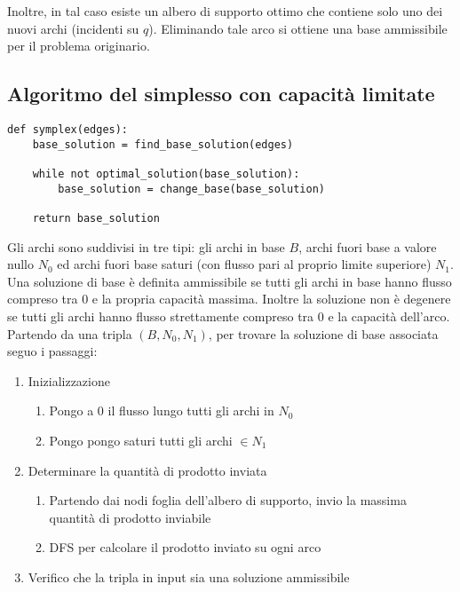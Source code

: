 \documentclass[../template]{subfiles}
\begin{document}
Inoltre, in tal caso esiste un albero di supporto ottimo che contiene solo uno dei nuovi archi (incidenti su $q$).
Eliminando tale arco si ottiene una base ammissibile per il problema originario.


\subsection{Algoritmo del simplesso con capacità limitate}
\begin{lstlisting}
def symplex(edges):
    base_solution = find_base_solution(edges)

    while not optimal_solution(base_solution):
        base_solution = change_base(base_solution)

    return base_solution
\end{lstlisting}
Gli archi sono suddivisi in tre tipi: gli archi in base $B$, archi fuori base a valore nullo $N_0$ ed archi fuori base saturi
(con flusso pari al proprio limite superiore) $N_1$.
\\
Una soluzione di base è definita ammissibile se tutti gli archi in base hanno flusso compreso tra 0 e la propria capacità massima.
Inoltre la soluzione non è degenere se tutti gli archi hanno flusso strettamente compreso tra 0 e la capacità dell'arco.
\\
Partendo da una tripla $(B, N_0, N_1)$, per trovare la soluzione di base associata seguo i passaggi:
\begin{enumerate}
    \item Inizializzazione
        \begin{enumerate}
            \item Pongo a 0 il flusso lungo tutti gli archi in $N_0$
            \item Pongo pongo saturi tutti gli archi $\in N_1$
        \end{enumerate}
    \item Determinare la quantità di prodotto inviata
        \begin{enumerate}
            \item Partendo dai nodi foglia dell'albero di supporto, invio la massima quantità di prodotto inviabile
            \item DFS per calcolare il prodotto inviato su ogni arco
        \end{enumerate}
    \item Verifico che la tripla in input sia una soluzione ammissibile
\end{enumerate}
\end{document}
